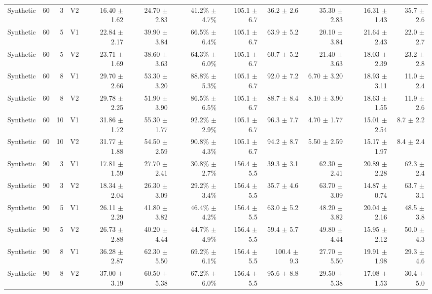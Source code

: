 \documentclass[10pt,a4paper]{article}
\begin{document}
\begin{landscape}
\begin{longtable}{@{}lrrlrrrrrrrr@{}}
Synthetic & 60 & 3 & V2 & 16.40 $\pm$ 1.62 & 24.70 $\pm$ 2.83 & 41.2\% $\pm$ 4.7\% & 105.1 $\pm$ 6.7 & 36.2 $\pm$ 2.6 & 35.30 $\pm$ 2.83 & 16.31 $\pm$ 1.43 & 35.7 $\pm$ 2.6 \\
Synthetic & 60 & 5 & V1 & 22.84 $\pm$ 2.17 & 39.90 $\pm$ 3.84 & 66.5\% $\pm$ 6.4\% & 105.1 $\pm$ 6.7 & 63.9 $\pm$ 5.2 & 20.10 $\pm$ 3.84 & 21.64 $\pm$ 2.43 & 22.0 $\pm$ 2.7 \\
Synthetic & 60 & 5 & V2 & 23.71 $\pm$ 1.69 & 38.60 $\pm$ 3.63 & 64.3\% $\pm$ 6.0\% & 105.1 $\pm$ 6.7 & 60.7 $\pm$ 5.2 & 21.40 $\pm$ 3.63 & 18.03 $\pm$ 2.39 & 23.2 $\pm$ 2.8 \\
Synthetic & 60 & 8 & V1 & 29.70 $\pm$ 2.66 & 53.30 $\pm$ 3.20 & 88.8\% $\pm$ 5.3\% & 105.1 $\pm$ 6.7 & 92.0 $\pm$ 7.2 & 6.70 $\pm$ 3.20 & 18.93 $\pm$ 3.11 & 11.0 $\pm$ 2.4 \\
Synthetic & 60 & 8 & V2 & 29.78 $\pm$ 2.25 & 51.90 $\pm$ 3.90 & 86.5\% $\pm$ 6.5\% & 105.1 $\pm$ 6.7 & 88.7 $\pm$ 8.4 & 8.10 $\pm$ 3.90 & 18.63 $\pm$ 1.55 & 11.9 $\pm$ 2.6 \\
Synthetic & 60 & 10 & V1 & 31.86 $\pm$ 1.72 & 55.30 $\pm$ 1.77 & 92.2\% $\pm$ 2.9\% & 105.1 $\pm$ 6.7 & 96.3 $\pm$ 7.7 & 4.70 $\pm$ 1.77 & 15.01 $\pm$ 2.54 & 8.7 $\pm$ 2.2 \\
Synthetic & 60 & 10 & V2 & 31.77 $\pm$ 1.88 & 54.50 $\pm$ 2.59 & 90.8\% $\pm$ 4.3\% & 105.1 $\pm$ 6.7 & 94.2 $\pm$ 8.7 & 5.50 $\pm$ 2.59 & 15.17 $\pm$ 1.97 & 8.4 $\pm$ 2.4 \\
Synthetic & 90 & 3 & V1 & 17.81 $\pm$ 1.59 & 27.70 $\pm$ 2.41 & 30.8\% $\pm$ 2.7\% & 156.4 $\pm$ 5.5 & 39.3 $\pm$ 3.1 & 62.30 $\pm$ 2.41 & 20.89 $\pm$ 2.28 & 62.3 $\pm$ 2.4 \\
Synthetic & 90 & 3 & V2 & 18.34 $\pm$ 2.04 & 26.30 $\pm$ 3.09 & 29.2\% $\pm$ 3.4\% & 156.4 $\pm$ 5.5 & 35.7 $\pm$ 4.6 & 63.70 $\pm$ 3.09 & 14.87 $\pm$ 0.74 & 63.7 $\pm$ 3.1 \\
Synthetic & 90 & 5 & V1 & 26.11 $\pm$ 2.29 & 41.80 $\pm$ 3.82 & 46.4\% $\pm$ 4.2\% & 156.4 $\pm$ 5.5 & 63.0 $\pm$ 5.2 & 48.20 $\pm$ 3.82 & 20.04 $\pm$ 2.16 & 48.5 $\pm$ 3.8 \\
Synthetic & 90 & 5 & V2 & 26.73 $\pm$ 2.88 & 40.20 $\pm$ 4.44 & 44.7\% $\pm$ 4.9\% & 156.4 $\pm$ 5.5 & 59.4 $\pm$ 5.7 & 49.80 $\pm$ 4.44 & 15.95 $\pm$ 2.12 & 50.0 $\pm$ 4.3 \\
Synthetic & 90 & 8 & V1 & 36.28 $\pm$ 2.87 & 62.30 $\pm$ 5.50 & 69.2\% $\pm$ 6.1\% & 156.4 $\pm$ 5.5 & 100.4 $\pm$ 9.3 & 27.70 $\pm$ 5.50 & 19.91 $\pm$ 1.98 & 29.3 $\pm$ 4.6 \\
Synthetic & 90 & 8 & V2 & 37.00 $\pm$ 3.19 & 60.50 $\pm$ 5.38 & 67.2\% $\pm$ 6.0\% & 156.4 $\pm$ 5.5 & 95.6 $\pm$ 8.8 & 29.50 $\pm$ 5.38 & 17.08 $\pm$ 1.53 & 30.4 $\pm$ 5.0 \\

\end{longtable}
\end{landscape}
\end{document}
